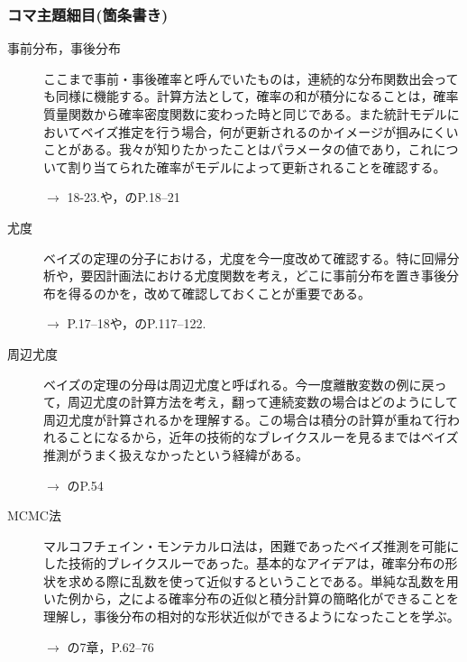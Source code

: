 \subsubsection{コマ主題細目(箇条書き)}
\begin{description}
\item[事前分布，事後分布]ここまで事前・事後確率と呼んでいたものは，連続的な分布関数出会っても同様に機能する。計算方法として，確率の和が積分になることは，確率質量関数から確率密度関数に変わった時と同じである。また統計モデルにおいてベイズ推定を行う場合，何が更新されるのかイメージが掴みにくいことがある。我々が知りたかったことはパラメータの値であり，これについて割り当てられた確率がモデルによって更新されることを確認する。
\begin{flushright}
    $\to$ \citet{Maeda2017}18-23.や，\citet{豊田201606}のP.18--21
\end{flushright}

\item[尤度] ベイズの定理の分子における，尤度を今一度改めて確認する。特に回帰分析や，要因計画法における尤度関数を考え，どこに事前分布を置き事後分布を得るのかを，改めて確認しておくことが重要である。
\begin{flushright}
    $\to$ \citet{豊田201606}P.17--18や，\citet{kosugi2018}のP.117--122.
\end{flushright}

\item[周辺尤度]ベイズの定理の分母は周辺尤度と呼ばれる。今一度離散変数の例に戻って，周辺尤度の計算方法を考え，翻って連続変数の場合はどのようにして周辺尤度が計算されるかを理解する。この場合は積分の計算が重ねて行われることになるから，近年の技術的なブレイクスルーを見るまではベイズ推測がうまく扱えなかったという経緯がある。
\begin{flushright}
    $\to$ \citet{馬場201907}のP.54
\end{flushright}

\item[MCMC法]マルコフチェイン・モンテカルロ法は，困難であったベイズ推測を可能にした技術的ブレイクスルーであった。基本的なアイデアは，確率分布の形状を求める際に乱数を使って近似するということである。単純な乱数を用いた例から，之による確率分布の近似と積分計算の簡略化ができることを理解し，事後分布の相対的な形状近似ができるようになったことを学ぶ。
\begin{flushright}
    $\to$ \citet{Maeda2017}の7章，\citet{馬場201907}P.62--76
\end{flushright}

\end{description}
